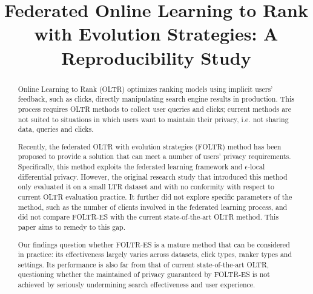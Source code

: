 \documentclass[runningheads]{llncs}
\begin{document}

\title{Federated Online Learning to Rank with Evolution Strategies: A Reproducibility Study}


%



\maketitle

\begin{abstract}
Online Learning to Rank (OLTR) optimizes ranking models using implicit users' feedback, such as clicks, directly manipulating search engine results in production. This process requires OLTR methods to collect user queries and clicks; current methods are not suited to situations in which users want to maintain their privacy, i.e. not sharing data, queries and clicks. 

Recently, the federated OLTR with evolution strategies (FOLTR) method has been proposed to provide a solution that can meet a number of users' privacy requirements. Specifically, this method exploits the federated learning framework and $\epsilon$-local differential privacy. However, the original research study that introduced this method only evaluated it on a small LTR dataset and with no conformity with respect to current OLTR evaluation practice. It further did not explore specific parameters of the method, such as the number of clients involved in the federated learning process, and did not compare FOLTR-ES with the current state-of-the-art OLTR method. This paper aims to remedy to this gap. 

Our findings question whether FOLTR-ES is a mature method that can be considered in practice: its effectiveness largely varies across datasets, click types, ranker types and settings. Its performance is also far from that of current state-of-the-art OLTR, questioning whether the maintained of privacy guaranteed by FOLTR-ES is not achieved by seriously undermining search effectiveness and user experience. 



\end{abstract}
\end{document}
